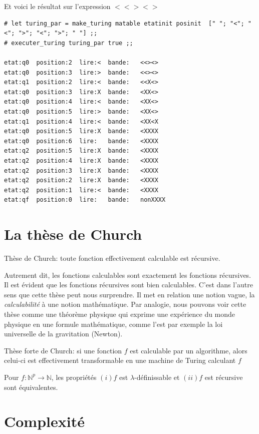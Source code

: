 Et voici le résultat sur l'expression $ <<><> $
\begin{Verbatim}
# let turing_par = make_turing matable etatinit posinit  [" "; "<"; "<"; ">"; "<"; ">"; " "] ;;
# executer_turing turing_par true ;;

etat:q0  position:2  lire:<  bande:   <<><> 
etat:q0  position:3  lire:>  bande:   <<><> 
etat:q1  position:2  lire:<  bande:   <<X<> 
etat:q0  position:3  lire:X  bande:   <XX<> 
etat:q0  position:4  lire:<  bande:   <XX<> 
etat:q0  position:5  lire:>  bande:   <XX<> 
etat:q1  position:4  lire:<  bande:   <XX<X 
etat:q0  position:5  lire:X  bande:   <XXXX 
etat:q0  position:6  lire:   bande:   <XXXX  
etat:q2  position:5  lire:X  bande:   <XXXX  
etat:q2  position:4  lire:X  bande:   <XXXX  
etat:q2  position:3  lire:X  bande:   <XXXX  
etat:q2  position:2  lire:X  bande:   <XXXX  
etat:q2  position:1  lire:<  bande:   <XXXX  
etat:qf  position:0  lire:   bande:   nonXXXX  
\end{Verbatim}
\section{La thèse de Church}
\begin{theoreme}
	Thèse de Church: toute fonction effectivement calculable est récursive.
\end{theoreme}
Autrement dit, les fonctions calculables sont exactement les fonctions récursives.
Il est évident que les fonctions récursives sont bien calculables. C'est dans
l'autre sens que cette thèse peut nous surprendre. Il met en relation une notion vague, 
la \textit{calculabilité} à une notion mathématique.
Par analogie, nous pouvons voir cette thèse comme une théorème physique qui exprime une expérience du
monde physique en une formule mathématique, 
comme l'est par exemple la loi universelle de la gravitation (Newton).


\begin{theoreme}
	Thèse forte de Church: si une fonction $f$ est calculable par un algorithme, 
	alors celui-ci est effectivement transformable en une machine de Turing 
	calculant $f$
\end{theoreme}
\begin{theoreme}
  Pour $f:\mathbb{N}^p \rightarrow \mathbb{N}$, les propriétés $(i) f$ est $\lambda$-définissable et 
  $(ii) f$ est récursive sont équivalentes.
\end{theoreme}

\section{Complexité}
